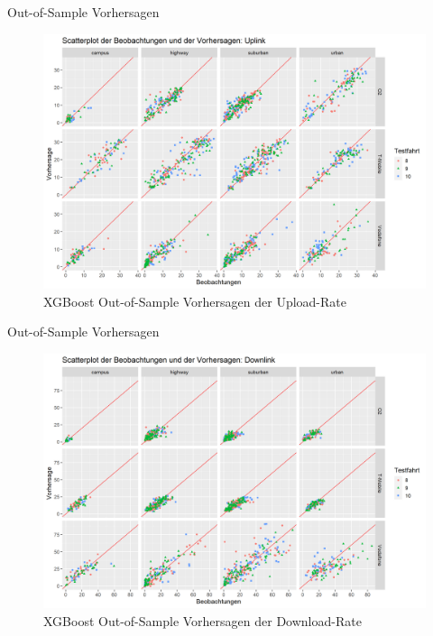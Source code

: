 \begin{frame}{Out-of-Sample Vorhersagen}
    \begin{figure}[h]
        \centering
        \includegraphics[scale=0.33]{plots/xgboost/uplink/scatter_colored_axes_fixed}
        \caption{XGBoost Out-of-Sample Vorhersagen der Upload-Rate}
        \label{xgboost_scatter_colored_uplink}
    \end{figure}
\end{frame}

\begin{frame}{Out-of-Sample Vorhersagen}
    \begin{figure}[h]
        \centering
        \includegraphics[scale=0.33]{plots/xgboost/downlink/scatter_colored_axes_fixed}
        \caption{XGBoost Out-of-Sample Vorhersagen der Download-Rate}
        \label{xgboost_scatter_colored_downlink}
    \end{figure}
\end{frame}